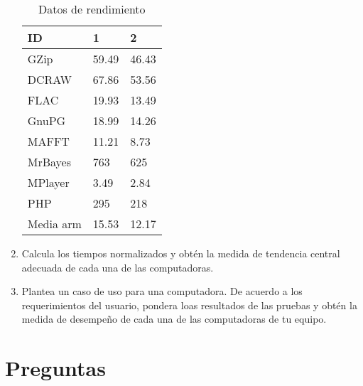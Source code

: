 \documentclass{article}
\begin{document}
\begin{enumerate}
{\begin{itemize}
{                    \begin{table}[]
                        \caption*{Datos de rendimiento}
                        \begin{center}
                            \begin{tabular}{|l|l|l|}
                                \hline
                                ID           & 1       & 2       \\ \hline
                                GZip         & 59.49   & 46.43   \\ \hline
                                DCRAW        & 67.86   & 53.56   \\ \hline
                                FLAC         & 19.93   & 13.49   \\ \hline
                                GnuPG        & 18.99   & 14.26   \\ \hline
                                MAFFT        & 11.21   & 8.73    \\ \hline
                                MrBayes      & 763     & 625     \\ \hline
                                MPlayer      & 3.49    & 2.84    \\ \hline
                                PHP          & 295     & 218     \\ \hline
                                Media arm & 15.53 & 12.17 \\ \hline
                            \end{tabular}
                        \end{center}
                    \end{table} 
                }
            \end{itemize}
            
        }
        \item {
            Calcula los tiempos normalizados y obtén la medida de tendencia 
            central adecuada de cada una de las computadoras.
        }
        \item {
            Plantea un caso de uso para una computadora. De acuerdo a los 
            requerimientos del usuario, pondera loas resultados de las pruebas 
            y obtén la medida de desempeño de cada una de las computadoras de tu
            equipo.
        }
    \end{enumerate}

    \section{Preguntas}
\end{document}

